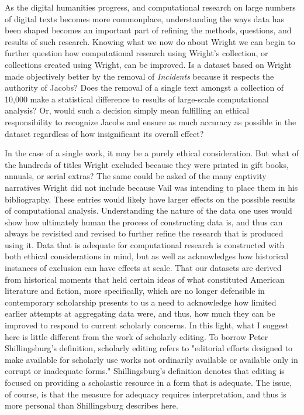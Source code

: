 As the digital humanities progress, and computational research on large numbers of digital texts becomes more commonplace, understanding the ways data has been shaped becomes an important part of refining the methods, questions, and results of such research. Knowing what we now do about Wright we can begin to further question how computational research using Wright's collection, or collections created using Wright, can be improved. Is a dataset based on Wright made objectively better by the removal of \textit{Incidents} because it respects the authority of Jacobs? Does the removal of a single text amongst a collection of 10,000 make a statistical difference to results of large-scale computational analysis? Or, would such a decision simply mean fulfilling an ethical responsibility to recognize Jacobs and ensure as much accuracy as possible in the dataset regardless of how insignificant its overall effect? 

In the case of a single work, it may be a purely ethical consideration. But what of the hundreds of titles Wright excluded because they were printed in gift books, annuals, or serial extras? The same could be asked of the many captivity narratives Wright did not include because Vail was intending to place them in his bibliography. These entries would likely have larger effects on the possible results of computational analysis. Understanding the nature of the data one uses would show how ultimately human the process of constructing data is, and thus can always be revisited and revised to further refine the research that is produced using it. Data that is adequate for computational research is constructed with both ethical considerations in mind, but as well as acknowledges how historical instances of exclusion can have effects at scale. That our datasets are derived from historical moments that held certain ideas of what constituted American literature and fiction, more specifically, which are no longer defensible in contemporary scholarship presents to us a need to acknowledge how limited earlier attempts at aggregating data were, and thus, how much they can be improved to respond to current scholarly concerns. In this light, what I suggest here is little different from the work of scholarly editing. To borrow Peter Shillingsburg's definition, scholarly editing refers to "editorial efforts designed to make available for scholarly use works not ordinarily available or available only in corrupt or inadequate forms." \autocite[2]{shillingsburg_scholarly_1996} Shillingsburg's definition denotes that editing is focused on providing a scholastic resource in a form that is adequate. The issue, of course, is that the measure for adequacy requires interpretation, and thus is more personal than Shillingsburg describes here. 

